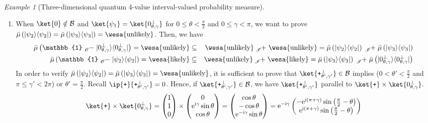 \documentclass{article}
\theoremstyle{remark}
\newtheorem{example}{Example}
\newcommand{\proj}[1]{|#1 \rangle\langle #1 |}
\newcommand{\ps}{\texttt{+}}
\newcommand{\likely}{{\mbox{\wesa{likely}}}}
\newcommand{\unlikely}{{\mbox{\wesa{unlikely}}}}
\newcommand{\rme}{\mathrm{e}}
\newcommand{\rmi}{\mathrm{i}}
\begin{document}
\begin{example}[Three-dimensional quantum 4-value interval-valued
probability measure]
\begin{enumerate}
\begin{eqnarray*}
\end{eqnarray*}
Similarly, when $\ket{\psi_{1}}$ is $\ket{\ps}$, equation (\ref{eq:non-additive-vectors})
holds. 
\item When $\ket{0}\notin\mathcal{B}$ and $\ket{\psi_{1}}=\ket{0_{\theta,\gamma}^{\perp}}$
for $0\le\theta<\frac{\pi}{2}$ and $0\le\gamma<\pi$, we want to
prove $\bar{\mu}\left(\proj{\psi_{2}}\right)=\bar{\mu}\left(\proj{\psi_{3}}\right)=\unlikely$.
Then, we have 
\begin{eqnarray*}
\bar{\mu}\left(\mathbb{1}\tensor*[_{\mathscr{O}}]{-}{}\proj{0_{\theta,\gamma}^{\perp}}\right)=\unlikely & \subseteq & \unlikely\tensor*[_{\mathscr{I}}]{+}{}\unlikely=\bar{\mu}\left(\proj{\psi_{2}}\right)\tensor*[_{\mathscr{I}}]{+}{}\bar{\mu}\left(\proj{\psi_{3}}\right)\\
\bar{\mu}\left(\mathbb{1}\tensor*[_{\mathscr{O}}]{-}{}\proj{\psi_{2}}\right)=\likely & \subseteq & \unlikely\tensor*[_{\mathscr{I}}]{+}{}\likely=\bar{\mu}\left(\proj{\psi_{3}}\right)\tensor*[_{\mathscr{I}}]{+}{}\bar{\mu}\left(\proj{0_{\theta,\gamma}^{\perp}}\right)
\end{eqnarray*}
In order to verify $\bar{\mu}\left(\proj{\psi_{2}}\right)=\bar{\mu}\left(\proj{\psi_{3}}\right)=\unlikely$,
it is sufficient to prove that $\ket{\ps_{\theta',\gamma'}^{\perp}}\in\mathcal{B}$
implies ($0<\theta'<\frac{\pi}{2}$ and $\pi\le\gamma'<2\pi$) or
$\theta'=\frac{\pi}{2}$. Recall $\ip{\ps}{\ps_{\theta',\gamma'}^{\perp}}=0$.
Hence, if $\ket{\ps_{\theta',\gamma'}^{\perp}}\in\mathcal{B}$, we
have $\ket{\ps_{\theta',\gamma'}^{\perp}}$ parallel to $\ket{\ps}\times\ket{0_{\theta,\gamma}^{\perp}}$.
\[
\ket{\ps}\times\ket{0_{\theta,\gamma}^{\perp}}=\begin{pmatrix}1\\
1\\
0
\end{pmatrix}\times\begin{pmatrix}0\\
\rme^{\rmi\gamma}\sin\theta\\
\cos\theta
\end{pmatrix}=\begin{pmatrix}\cos\theta\\
-\cos\theta\\
\rme^{-\rmi\gamma}\sin\theta
\end{pmatrix}=\rme^{-\rmi\gamma}\begin{pmatrix}-\rme^{\rmi\left(\pi+\gamma\right)}\sin\left(\frac{\pi}{2}-\theta\right)\\
\rme^{\rmi\left(\pi+\gamma\right)}\sin\left(\frac{\pi}{2}-\theta\right)\\

\end{pmatrix}\]
\end{enumerate}
\end{example}
\end{document}
